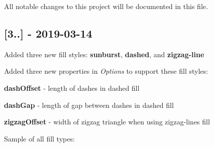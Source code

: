 All notable changes to this project will be documented in this file.

\subsection*{\mbox{[}3..\mbox{]} -\/ 2019-\/03-\/14}


\begin{DoxyItemize}
\item Added three new fill styles\+: {\bfseries sunburst}, {\bfseries dashed}, and {\bfseries zigzag-\/line}
\item Added three new properties in {\itshape Options} to support these fill styles\+:
\item {\bfseries dash\+Offset} -\/ length of dashes in dashed fill
\item {\bfseries dash\+Gap} -\/ length of gap between dashes in dashed fill
\item {\bfseries zigzag\+Offset} -\/ width of zigzag triangle when using zigzag-\/lines fill
\end{DoxyItemize}

Sample of all fill types\+:

 
